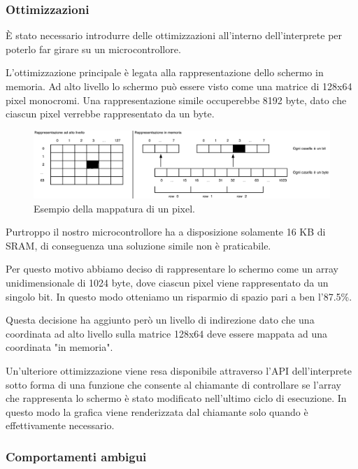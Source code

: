 \documentclass[a4paper]{article}
\begin{document}
\subsubsection{Ottimizzazioni}

È stato necessario introdurre delle ottimizzazioni all'interno
dell'interprete per poterlo far girare su un microcontrollore.

L'ottimizzazione principale è legata alla rappresentazione dello
schermo in memoria. Ad alto livello lo schermo può essere visto
come una matrice di 128x64 pixel monocromi. Una rappresentazione
simile occuperebbe 8192 byte, dato che ciascun pixel verrebbe
rappresentato da un byte.

\begin{figure}[h!t]
    \begin{center}
        \includegraphics[scale=0.38]{figures/screenopt_small.pdf}
    \end{center}
    \caption{Esempio della mappatura di un pixel.}
    \label{fig:screenopt}
\end{figure}

Purtroppo il nostro microcontrollore ha a disposizione solamente 16 KB di SRAM, di conseguenza
una soluzione simile non è praticabile.

Per questo motivo abbiamo deciso di rappresentare lo schermo come un array unidimensionale di
1024 byte, dove ciascun pixel viene rappresentato da un singolo bit. In questo modo otteniamo
un risparmio di spazio pari a ben l'87.5\%.

Questa decisione ha aggiunto però un livello di indirezione dato
che una coordinata ad alto livello sulla matrice 128x64 deve essere
mappata ad una coordinata "in memoria".

Un'ulteriore ottimizzazione viene resa disponibile attraverso l'API
dell'interprete sotto forma di una funzione che consente al chiamante
di controllare se l'array che rappresenta lo schermo è stato
modificato nell'ultimo ciclo di esecuzione. In questo modo la grafica
viene renderizzata dal chiamante solo quando è effettivamente
necessario.

\subsubsection{Comportamenti ambigui}
\end{document}
